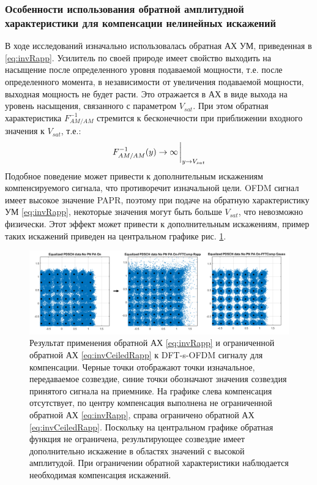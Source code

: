 \subsubsection{Особенности использования обратной амплитудной
характеристики для компенсации нелинейных искажений}
В ходе исследований изначально использовалась обратная АХ УМ, приведенная в
\ref{eq:invRapp}. Усилитель по своей природе имеет свойство выходить на
насыщение после определенного уровня подаваемой мощности, т.е. после
определенного момента, в независимости от увеличения подаваемой мощности,
выходная мощность не будет расти. Это отражается в АХ в виде выхода на
уровень насыщения, связанного с параметром $V_{sat}$. При этом обратная
характеристика $F^{-1}_{AM/AM}$ стремится к бесконечности при приближении
входного значения к $V_{sat}$, т.е.:
\begin{equation}
    F^{-1}_{AM/AM}(y) \rightarrow \infty \eval_{y \rightarrow V_{sat}}
\end{equation}
Подобное поведение может привести к дополнительным искажениям
компенсируемого сигнала, что противоречит изначальной цели. OFDM сигнал
имеет высокое значение PAPR, поэтому при подаче на обратную характеристику
УМ \ref{eq:invRapp}, некоторые значения могут быть больше $V_{sat}$, что
невозможно физически. Этот эффект может привести к дополнительным
искажениям, пример таких искажений приведен на центральном графике рис.
\ref{fig:inf_distortion}.

\begin{figure}[h!]
    \centering
    \includegraphics[width=0.9\linewidth]{figs/ceiled_rapp_result.png}
    \caption{Результат применения обратной АХ \ref{eq:invRapp} и
    ограниченной обратной АХ \ref{eq:invCeiledRapp} к DFT-s-OFDM сигналу
    для компенсации. Черные точки отображают точки изначальное,
    передаваемое созвездие, синие точки обозначают значения созвездия
    принятого сигнала на приемнике. На графике слева компенсация
    отсутствует, по центру компенсация выполнена не ограниченной обратной
    АХ \ref{eq:invRapp}, справа ограничено обратной АХ
    \ref{eq:invCeiledRapp}. Поскольку на центральном графике обратная
    функция не ограничена, результирующее созвездие имеет дополнительно
    искажение в областях значений с высокой амплитудой. При ограничении
    обратной характеристики наблюдается необходимая компенсация искажений.}
    \label{fig:inf_distortion}
\end{figure}

